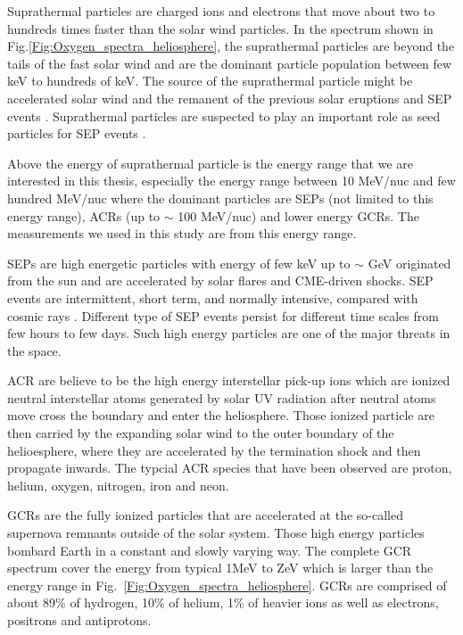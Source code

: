 
Suprathermal particles are charged ions and electrons that move about two to hundreds times faster than the solar wind particles. In the spectrum shown in Fig.\ref{Fig:Oxygen_spectra_heliosphere}, the suprathermal particles are beyond the tails of the fast solar wind and are the dominant particle population between few keV to hundreds of keV. The source of the suprathermal particle might be accelerated solar wind and the remanent of the previous solar eruptions and \ac{SEP} events \citep{Gloeckler1995SSRv}. Suprathermal particles are suspected to play an important role as seed particles for \ac{SEP} events \citep{Kahler2019ApJ}.

Above the energy of suprathermal particle is the energy range that we are interested in this thesis, especially the energy range between 10 MeV/nuc and few hundred MeV/nuc where the dominant particles are \acp{SEP} (not limited to this energy range), \acp{ACR} (up to $\sim$ 100 MeV/nuc) and lower energy \acp{GCR}. The measurements we used in this study are from this energy range.

\acp{SEP} are high energetic particles with energy of few keV up to $\sim$ GeV originated from the sun and are accelerated by solar flares and \ac{CME}-driven shocks. \acs{SEP} events are intermittent, short term, and normally intensive, compared with cosmic rays \citep{Reames1999}. Different type of \acs{SEP} events persist for different time scales from few hours to few days. Such high energy particles are one of the major threats in the space.

\acs{ACR} are believe to be the high energy interstellar pick-up ions \citep{Giacalone2022SSRv} which are ionized neutral interstellar atoms generated by solar UV radiation after neutral atoms move cross the boundary and enter the heliosphere. Those ionized particle are then carried by the expanding solar wind to the outer boundary of the helioesphere, where they are accelerated by the termination shock and then propagate inwards. The typcial \ac{ACR} species that have been observed are proton, helium, oxygen, nitrogen, iron and neon. 

\acp{GCR} are the fully ionized particles that are accelerated at the so-called supernova remnants \citep{Blasi2013AARv2013} outside of the solar system. Those high energy particles bombard Earth in a constant and slowly varying way. The complete GCR spectrum cover the energy from typical 1MeV \citep{Potgieter2013LRSP} to ZeV which is larger than the energy range in Fig.~\ref{Fig:Oxygen_spectra_heliosphere}. \acp{GCR} are comprised of about 89\% of hydrogen, 10\% of helium, 1\% of heavier ions as well as electrons, positrons and antiprotons. 

